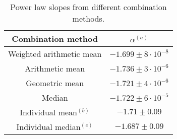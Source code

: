 \begin{table}
\centering
\begin{center}
\caption{Power law slopes from different combination methods. \label{tab:targets}}

\begin{tabular}{cc}
\hline
\noalign{\smallskip}
Combination method &  $\alpha$$^{(a)}$ \\  
\hline


Weighted arithmetic mean  & $-1.699\pm 8 \cdot 10^{-8}$   \\
Arithmetic mean  & $-1.736\pm 3 \cdot 10^{-6}$   \\
Geometric mean  & $-1.721\pm 4 \cdot 10^{-6}$   \\
Median  & $-1.722\pm 6 \cdot 10^{-5}$   \\

Individual mean$^{(b)}$  & $-1.71\pm 0.09$   \\
Individual median$^{(c)}$ & $-1.687\pm 0.09$   \\
\hline
\hline
\end{tabular}
\end{center}


\end{table}



